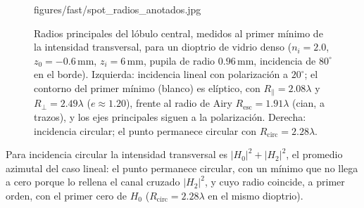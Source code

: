 \begin{figure}[!htbp]
  \centering
    {figures/fast/spot_radios_anotados.jpg}
  \caption{Radios principales del lóbulo central, medidos al primer mínimo de
  la intensidad transversal, para un dioptrio de vidrio denso ($n_i=2.0$,
  $z_0=-0.6\,\mathrm{mm}$, $z_i=6\,\mathrm{mm}$, pupila de radio
  $0.96\,\mathrm{mm}$, incidencia de $80^\circ$ en el borde). Izquierda:
  incidencia lineal con polarización a $20^\circ$; el contorno del primer mínimo
  (blanco) es elíptico, con $R_\parallel=2.08\lambda$ y $R_\perp=2.49\lambda$
  ($e\approx1.20$), frente al radio de Airy $R_{\mathrm{esc}}=1.91\lambda$
  (cian, a trazos), y los ejes principales siguen a la polarización. Derecha:
  incidencia circular; el punto permanece circular con
  $R_{\mathrm{circ}}=2.28\lambda$.}
  \label{fig:spot-radios-anotados}
\end{figure}

Para incidencia circular la intensidad transversal es $|H_0|^2+|H_2|^2$, el
promedio azimutal del caso lineal: el punto permanece circular, con un mínimo
que no llega a cero porque lo rellena el canal cruzado $|H_2|^2$, y cuyo radio
coincide, a primer orden, con el primer cero de $H_0$
($R_{\mathrm{circ}}=2.28\lambda$ en el mismo dioptrio).

